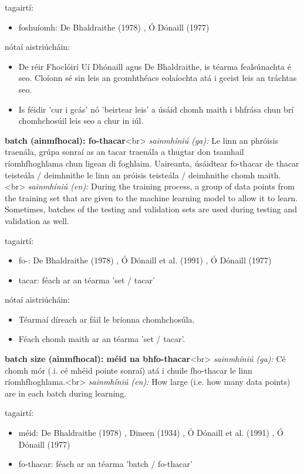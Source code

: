 \documentclass{article}
\begin{document}
tagairtí:
\begin{itemize}
	\item foshuíomh: De Bhaldraithe (1978) \cite{de-bhaldraithe}, Ó Dónaill (1977) \cite{odonaill}
\end{itemize}

nótaí aistriúcháin:
\begin{itemize}
	\item De réir Fhoclóirí Uí Dhónaill agus De Bhaldraithe, is téarma fealsúnachta é seo. Cloíonn sé sin leis an gcomhthéacs eolaíochta atá i gceist leis an tráchtas seo.
	\item Is féidir 'cur i gcás' nó 'beirtear leis' a úsáid chomh maith i bhfrása chun brí chomhchosúil leis seo a chur in iúl.
\end{itemize}


\textbf{batch (ainmfhocal): fo-thacar}<br>
\textit{sainmhíniú (ga):} Le linn an phróisis traenála, grúpa sonraí as an tacar traenála a thugtar don tsamhail ríomhfhoghlama chun ligean di foghlaim. Uaireanta, úsáidtear fo-thacar de thacar teisteála / deimhnithe le linn an próisis teisteála / deimhnithe chomh maith.<br>
\textit{sainmhíniú (en):} During the training process, a group of data points from the training set that are given to the machine learning model to allow it to learn. Sometimes, batches of the testing and validation sets are used during testing and validation as well.

tagairtí:
\begin{itemize}
	\item fo-: De Bhaldraithe (1978) \cite{de-bhaldraithe}, Ó Dónaill et al. (1991) \cite{focloir-beag}, Ó Dónaill (1977) \cite{odonaill}
	\item tacar: féach ar an téarma 'set / tacar'
\end{itemize}

nótaí aistriúcháin:
\begin{itemize}
	\item Téarmaí díreach ar fáil le bríonna chomhchosúla.
	\item Féach chomh maith ar an téarma 'set / tacar'.
\end{itemize}


\textbf{batch size (ainmfhocal): méid na bhfo-thacar}<br>
\textit{sainmhíniú (ga):} Cé chomh mór (.i. cé mhéid pointe sonraí) atá i chuile fho-thacar le linn ríomhfhoghlama.<br>
\textit{sainmhíniú (en):} How large (i.e. how many data points) are in each batch during learning.

tagairtí:
\begin{itemize}
	\item méid: De Bhaldraithe (1978) \cite{de-bhaldraithe}, Dineen (1934) \cite{dineen}, Ó Dónaill et al. (1991) \cite{focloir-beag}, Ó Dónaill (1977) \cite{odonaill}
	\item fo-thacar: féach ar an téarma 'batch / fo-thacar'
\end{itemize}
\end{document}
